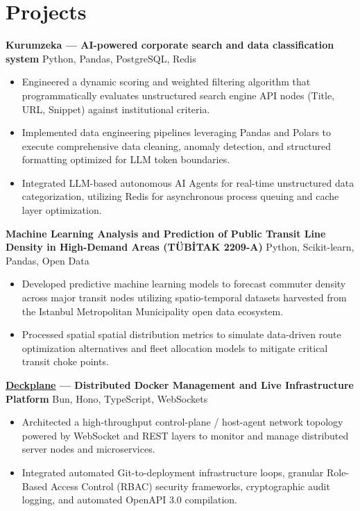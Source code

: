 \documentclass[10pt,a4paper]{extarticle}
\begin{document}
\section{Projects}
\noindent\textbf{Kurumzeka --- AI-powered corporate search and data classification system} \hfill Python, Pandas, PostgreSQL, Redis\\
\begin{itemize}[leftmargin=*,noitemsep,topsep=2pt]
    \item Engineered a dynamic scoring and weighted filtering algorithm that programmatically evaluates unstructured search engine API nodes (Title, URL, Snippet) against institutional criteria.
    \item Implemented data engineering pipelines leveraging Pandas and Polars to execute comprehensive data cleaning, anomaly detection, and structured formatting optimized for LLM token boundaries.
    \item Integrated LLM-based autonomous AI Agents for real-time unstructured data categorization, utilizing Redis for asynchronous process queuing and cache layer optimization.
\end{itemize}

\noindent\textbf{Machine Learning Analysis and Prediction of Public Transit Line Density in High-Demand Areas (TÜBİTAK 2209-A)} \hfill Python, Scikit-learn, Pandas, Open Data\\
\begin{itemize}[leftmargin=*,noitemsep,topsep=2pt]
    \item Developed predictive machine learning models to forecast commuter density across major transit nodes utilizing spatio-temporal datasets harvested from the Istanbul Metropolitan Municipality open data ecosystem.
    \item Processed spatial spatial distribution metrics to simulate data-driven route optimization alternatives and fleet allocation models to mitigate critical transit choke points.
\end{itemize}

\noindent\textbf{\href{https://deckplane.com}{Deckplane} --- Distributed Docker Management and Live Infrastructure Platform} \hfill Bun, Hono, TypeScript, WebSockets\\
\begin{itemize}[leftmargin=*,noitemsep,topsep=2pt]
    \item Architected a high-throughput control-plane / host-agent network topology powered by WebSocket and REST layers to monitor and manage distributed server nodes and microservices.
    \item Integrated automated Git-to-deployment infrastructure loops, granular Role-Based Access Control (RBAC) security frameworks, cryptographic audit logging, and automated OpenAPI 3.0 compilation.
\end{itemize}
\end{document}
